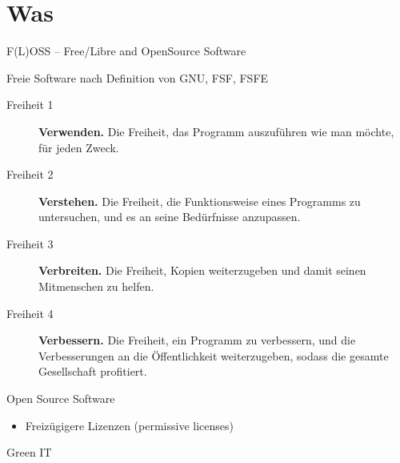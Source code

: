 \documentclass[t]{beamer}
\makeatletter
\newcommand{\strong}[1]{\@strong{#1}}
\newcommand{\@@strong}[1]{\textbf{\let\@strong\@@@strong#1}}
\newcommand{\@@@strong}[1]{\textnormal{\let\@strong\@@strong#1}}
\let\@strong\@@strong
\makeatother
\begin{document}
\section{Was}

\begin{frame}{F(L)OSS -- Free/Libre and OpenSource Software}
    \begin{block}{Freie Software nach Definition von GNU, FSF, FSFE}
        \begin{description}
            \item[Freiheit 1] \strong{Verwenden.} {\small Die Freiheit,
                das Programm auszuführen wie man möchte, für jeden
                Zweck.}
            \item[Freiheit 2] \strong{Verstehen.} {\small Die Freiheit,
                die Funktionsweise eines Programms zu untersuchen, und
                es an seine Bedürfnisse anzupassen.}
            \item[Freiheit 3] \strong{Verbreiten.} {\small Die Freiheit,
                Kopien weiterzugeben und damit seinen Mitmenschen zu
                helfen.}
            \item[Freiheit 4] \strong{Verbessern.} {\small Die Freiheit,
                ein Programm zu verbessern, und die Verbesserungen
                an die Öffentlichkeit weiterzugeben, sodass die
                gesamte Gesellschaft profitiert.}
        \end{description}
    \end{block}
    \pause
    \begin{block}{Open Source Software}
        \begin{itemize}
            \item Freizügigere Lizenzen (permissive licenses)
        \end{itemize}
    \end{block}
\end{frame}

\begin{frame}[c]{Green IT}
    \begin{centering}
        \par
    \end{centering}
\end{frame}
\end{document}
